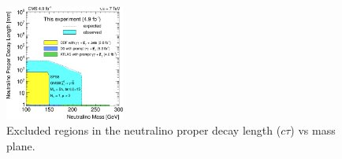 \documentclass[twocolumn,twoside,10pt,nodate]{article}
\begin{document}
\begin{figure}[h]
\centering
\includegraphics[width=0.35\textwidth,angle=0]{santanastasio_fig2.png}
\caption{\small Excluded regions in the neutralino proper decay length
  ($c\tau$) vs mass plane.} %
\end{figure}


\end{document}
